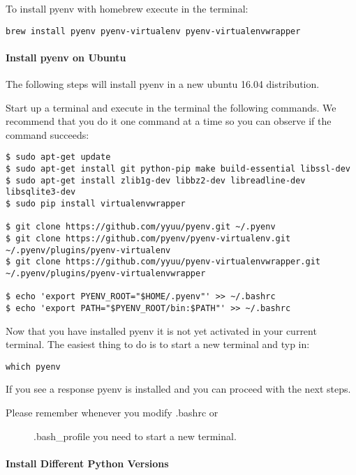 To install pyenv with homebrew execute in the terminal:

\begin{verbatim}
brew install pyenv pyenv-virtualenv pyenv-virtualenvwrapper
\end{verbatim}

\paragraph{Install pyenv on Ubuntu}\label{install-pyenv-on-ubuntu}

The following steps will install pyenv in a new ubuntu 16.04
distribution.

Start up a terminal and execute in the terminal the following commands.
We recommend that you do it one command at a time so you can observe if
the command succeeds:

\begin{verbatim}
$ sudo apt-get update
$ sudo apt-get install git python-pip make build-essential libssl-dev
$ sudo apt-get install zlib1g-dev libbz2-dev libreadline-dev libsqlite3-dev
$ sudo pip install virtualenvwrapper

$ git clone https://github.com/yyuu/pyenv.git ~/.pyenv
$ git clone https://github.com/pyenv/pyenv-virtualenv.git ~/.pyenv/plugins/pyenv-virtualenv   
$ git clone https://github.com/yyuu/pyenv-virtualenvwrapper.git ~/.pyenv/plugins/pyenv-virtualenvwrapper

$ echo 'export PYENV_ROOT="$HOME/.pyenv"' >> ~/.bashrc
$ echo 'export PATH="$PYENV_ROOT/bin:$PATH"' >> ~/.bashrc
\end{verbatim}

Now that you have installed pyenv it is not yet activated in your
current terminal. The easiest thing to do is to start a new terminal and
typ in:

\begin{verbatim}
which pyenv
\end{verbatim}

If you see a response pyenv is installed and you can proceed with the
next steps.

\begin{description}
\item[Please remember whenever you modify .bashrc or]
.bash\_profile you need to start a new terminal.
\end{description}

\paragraph{Install Different Python
Versions}\label{install-different-python-versions}

